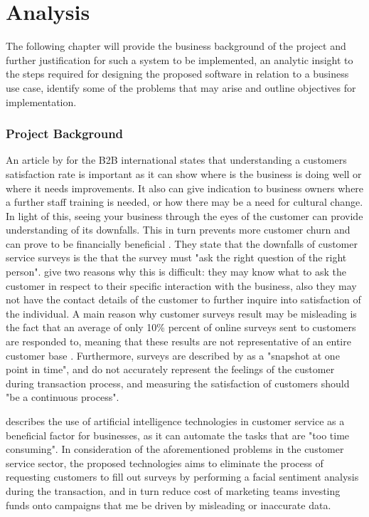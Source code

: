 \chapter{Analysis }

The following chapter will provide the business background of the project and further justification for such a system to be implemented, an analytic insight to the steps required for designing the proposed software in relation to a business use case, identify some of the problems that may arise and outline objectives for implementation.

\subsection*{Project Background}
An article by \citeauthor{hague} for the B2B international states that understanding a customers satisfaction rate is important as it can show where is the business is doing well or where it needs improvements. It also can give indication to business owners where a further staff training is needed, or how there may be a need for cultural change. In light of this, seeing your business through the eyes of the customer can provide understanding of its downfalls. This in turn prevents more customer churn and can prove to be financially beneficial \citep{hague}. They state that the downfalls of customer service surveys is the that the survey must "ask the right question of the right person". \citeauthor{hague} give two reasons why this is difficult: they may know what to ask the customer in respect to their specific interaction with the business, also they may not have the contact details of the customer to further inquire into satisfaction of the individual. A main reason why customer surveys result may be misleading is the fact that an average of only 10\% percent of online surveys sent to customers are responded to, meaning that these results are not representative of an entire customer base \citep{willott} . Furthermore, surveys are described by \citeauthor{hague} as a "snapshot at one point in time", and do not accurately represent the feelings of the customer during transaction process, and measuring the satisfaction of customers should "be a continuous process".


\citeauthor{keith} describes the use of artificial intelligence technologies in customer service as a beneficial factor for businesses, as it can automate the tasks that are "too time consuming".
In consideration of the aforementioned problems in the customer service sector, the proposed technologies aims to eliminate the process of requesting customers to fill out surveys by performing a facial sentiment analysis during the transaction, and in turn reduce cost of marketing teams investing funds onto campaigns that me be driven by misleading or inaccurate data.

